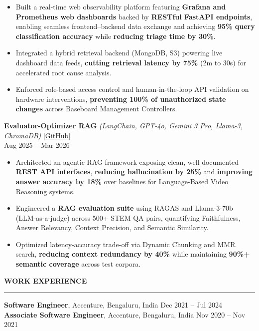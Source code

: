 \documentclass[letterpaper,10.5pt]{extarticle}
\newcommand{\resumesection}[1]{%
    \vspace{6pt}%
    \noindent\textbf{#1}\vspace{-5pt}%
    \\\noindent\rule{\textwidth}{0.5pt}%
    \vspace{1pt}%
}
\begin{document}
\begin{itemize}[leftmargin=12pt, topsep=1pt, itemsep=0pt, parsep=0pt]
    \item Built a real-time web observability platform featuring \textbf{Grafana and Prometheus web dashboards} backed by \textbf{RESTful FastAPI endpoints}, enabling seamless frontend--backend data exchange and achieving \textbf{95\% query classification accuracy} while \textbf{reducing triage time by 30\%}.
    \item Integrated a hybrid retrieval backend (MongoDB, S3) powering live dashboard data feeds, \textbf{cutting retrieval latency by 75\%} (2m to 30s) for accelerated root cause analysis.
    \item Enforced role-based access control and human-in-the-loop API validation on hardware interventions, \textbf{preventing 100\% of unauthorized state changes} across Baseboard Management Controllers.
\end{itemize}

\vspace{4pt}

\noindent\textbf{Evaluator-Optimizer RAG} \textit{(LangChain, GPT-4o, Gemini 3 Pro, Llama-3, ChromaDB)} \hfill \href{https://github.com/slowloris-98/Evaluator-Optimizer-RAG}{[GitHub]}\\
Aug 2025 -- Mar 2026

\begin{itemize}[leftmargin=12pt, topsep=1pt, itemsep=0pt, parsep=0pt]
    \item Architected an agentic RAG framework exposing clean, well-documented \textbf{REST API interfaces}, \textbf{reducing hallucination by 25\%} and \textbf{improving answer accuracy by 18\%} over baselines for Language-Based Video Reasoning systems.
    \item Engineered a \textbf{RAG evaluation suite} using RAGAS and Llama-3-70b (LLM-as-a-judge) across 500+ STEM QA pairs, quantifying Faithfulness, Answer Relevancy, Context Precision, and Semantic Similarity.
    \item Optimized latency-accuracy trade-off via Dynamic Chunking and MMR search, \textbf{reducing context redundancy by 40\%} while maintaining \textbf{90\%+ semantic coverage} across test corpora.
\end{itemize}

\resumesection{WORK EXPERIENCE}

\noindent\textbf{Software Engineer}, Accenture, Bengaluru, India \hfill Dec 2021 -- Jul 2024\\
\textbf{Associate Software Engineer}, Accenture, Bengaluru, India \hfill Nov 2020 -- Nov 2021
\end{document}
